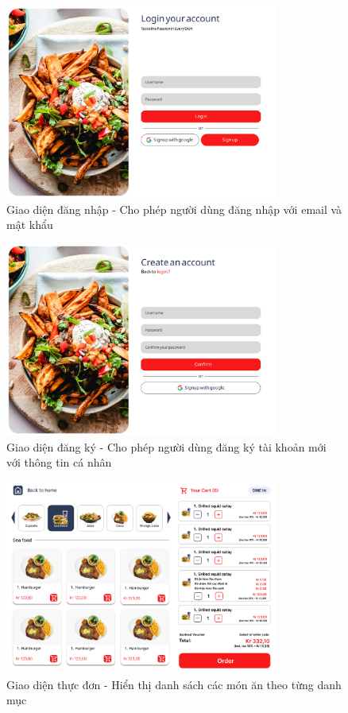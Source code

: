 \documentclass[a4paper]{article}
\begin{document}
\begin{itemize}
    \begin{figure}[H]
        \centering
        \includegraphics[width=0.8\textwidth]{figmaLogin.png}
        \caption{Giao diện đăng nhập - Cho phép người dùng đăng nhập với email và mật khẩu}
    \end{figure}
    
    \begin{figure}[H]
        \centering
        \includegraphics[width=0.8\textwidth]{figmaRegister.png}
        \caption{Giao diện đăng ký - Cho phép người dùng đăng ký tài khoản mới với thông tin cá nhân}
    \end{figure}
    
    \begin{figure}[H]
        \centering
        \includegraphics[width=0.8\textwidth]{figmaMenu.png}
        \caption{Giao diện thực đơn - Hiển thị danh sách các món ăn theo từng danh mục}
    \end{figure}
    

\end{itemize}
\end{document}
